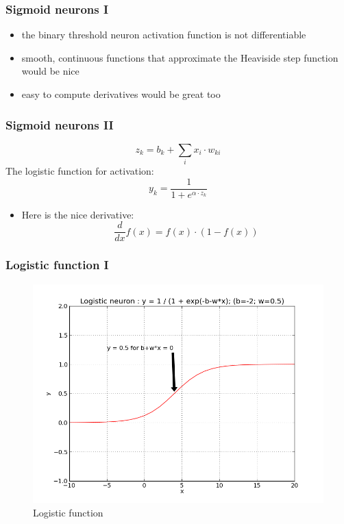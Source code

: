 \begin{frame}
  \frametitle{Sigmoid neurons I}
  \begin{itemize}
  \item the binary threshold neuron activation function is not
    differentiable
  \item smooth, continuous functions that approximate the Heaviside
    step function would be nice
  \item easy to compute derivatives would be great too
  \end{itemize}
\end{frame}

\begin{frame}
  \frametitle{Sigmoid neurons II}
  \begin{definition}
    \begin{equation}
      \label{eq:logistic-neuron-1}
      z_k = b_k + \displaystyle\sum_{i}x_i\cdot w_{ki}
    \end{equation}
    The logistic function for activation:
    \begin{equation}
      \label{eq:logistic-neuron-2}
      y_k = \frac{1}{1 + e^{\alpha \cdot z_k}}
    \end{equation}
  \end{definition}
  \begin{itemize}
  \item Here is the nice derivative:
    \begin{equation}
      \label{eq:logistic-derivative}
      \frac{d}{dx}f(x) = f(x) \cdot (1 - f(x))
    \end{equation}
  \end{itemize}
\end{frame}

\begin{frame}
  \frametitle{Logistic function I}
  \begin{figure}[h!]
    \centering
    \includegraphics[height = .7\textheight]{graphics/logistic_neuron.png}
    \caption{Logistic function}
  \end{figure}
\end{frame}

